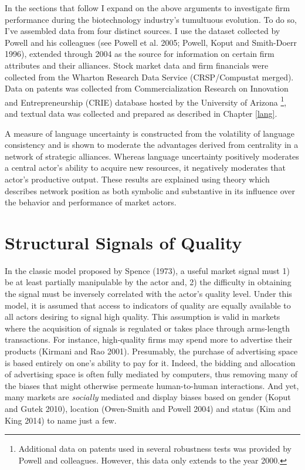 In the sections that follow I expand on the above arguments to investigate firm performance during the biotechnology industry's tumultuous evolution. To do so, I've assembled data from four distinct sources. I use the dataset collected by Powell and his colleagues (see Powell et al. 2005; Powell, Koput and Smith-Doerr 1996), extended through 2004 as the source for information on certain firm attributes and their alliances. Stock market data and firm financials were collected from the Wharton Research Data Service (CRSP/Compustat merged). Data on patents was collected from Commercialization Research on Innovation and Entrepreneurship (CRIE) database hosted by the University of Arizona \footnote{Additional data on patents used in several robustness tests was provided by Powell and colleagues. However, this data only extends to the year 2000.}, and textual data was collected and prepared as described in Chapter \ref{lang}. 

A measure of language uncertainty is constructed from the volatility of language consistency and is shown to moderate the advantages derived from centrality in a network of strategic alliances. Whereas language uncertainty positively moderates a central actor's ability to acquire new resources, it negatively moderates that actor's productive output. These results are explained using theory which describes network position as both symbolic and substantive in its influence over the behavior and performance of market actors.

\section{Structural Signals of Quality \label{sig_qual}}

In the classic model proposed by Spence (1973), a useful market signal must 1) be at least partially manipulable by the actor and, 2) the difficulty in obtaining the signal must be inversely correlated with the actor's quality level. Under this model, it is assumed that access to indicators of quality are equally available to all actors desiring to signal high quality. This assumption is valid in markets where the acquisition of signals is regulated or takes place through arms-length transactions. For instance, high-quality firms may spend more to advertise their products (Kirmani and Rao 2001). Presumably, the purchase of advertising space is based entirely on one's ability to pay for it. Indeed, the bidding and allocation of advertising space is often fully mediated by computers, thus removing many of the biases that might otherwise permeate human-to-human interactions. And yet, many markets are \emph{socially} mediated and display biases based on gender (Koput and Gutek 2010), location (Owen-Smith and Powell 2004) and status (Kim and King 2014) to name just a few. 

